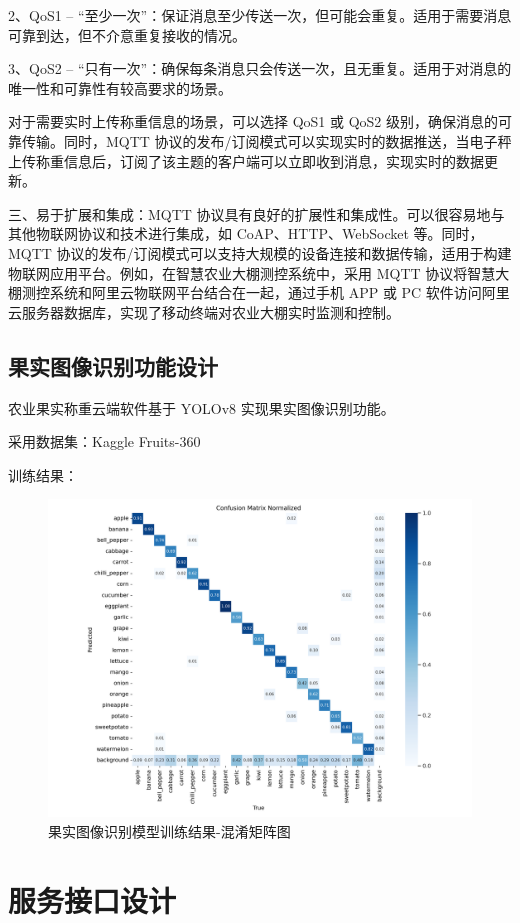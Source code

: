 2、QoS1 – “至少一次”：保证消息至少传送一次，但可能会重复。适用于需要消息可靠到达，但不介意重复接收的情况。

3、QoS2 – “只有一次”：确保每条消息只会传送一次，且无重复。适用于对消息的唯一性和可靠性有较高要求的场景。

对于需要实时上传称重信息的场景，可以选择 QoS1 或 QoS2 级别，确保消息的可靠传输。同时，MQTT 协议的发布/订阅模式可以实现实时的数据推送，当电子秤上传称重信息后，订阅了该主题的客户端可以立即收到消息，实现实时的数据更新。

三、易于扩展和集成：MQTT 协议具有良好的扩展性和集成性。可以很容易地与其他物联网协议和技术进行集成，如 CoAP、HTTP、WebSocket 等。同时，MQTT 协议的发布/订阅模式可以支持大规模的设备连接和数据传输，适用于构建物联网应用平台。例如，在智慧农业大棚测控系统中，采用 MQTT 协议将智慧大棚测控系统和阿里云物联网平台结合在一起，通过手机 APP 或 PC 软件访问阿里云服务器数据库，实现了移动终端对农业大棚实时监测和控制\cite{Liang2020}。

\subsection{果实图像识别功能设计}

农业果实称重云端软件基于 YOLOv8 实现果实图像识别功能。

采用数据集：Kaggle Fruits-360

训练结果：

\begin{figure}[H]
    \centering
    \includegraphics[width=0.8\linewidth]{../source/aws-img/yolov8/out/image/confusion_matrix_normalized.png}
    \caption{果实图像识别模型训练结果-混淆矩阵图}
    \label{fig:confusion_matrix_normalized}
\end{figure}

\section{服务接口设计}\label{sec:service}

